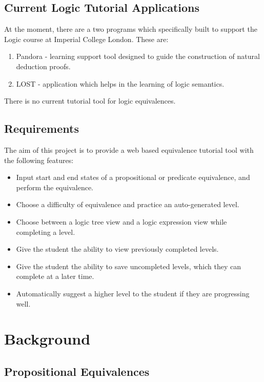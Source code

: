 \documentclass[12pt]{article}
\begin{document}
\subsection{Current Logic Tutorial Applications}

At the moment, there are a two programs which specifically built to support the
Logic course at Imperial College London. These are:

\begin{enumerate}
  \item Pandora - learning support tool designed to guide the construction of
         natural deduction proofs. 
  \item LOST - application which helps in the learning of logic semantics.
\end{enumerate}

There is no current tutorial tool for logic equivalences.

\subsection{Requirements}

The aim of this project is to provide a web based equivalence tutorial tool
with the following features:

\begin{itemize}

	\item Input start and end states of a propositional or predicate equivalence, 
         and perform the equivalence.
	\item Choose a difficulty of equivalence and practice an auto-generated
			   level.
	\item Choose between a logic tree view and a logic expression view while
				 completing a level.
	\item Give the student the ability to view previously completed levels.
	\item Give the student the ability to save uncompleted levels, which they
				 can complete at a later time.
	\item Automatically suggest a higher level to the student if they are
				 progressing well.
\end{itemize}

\newpage


\section{Background}
\subsection{Propositional Equivalences}
\end{document}

